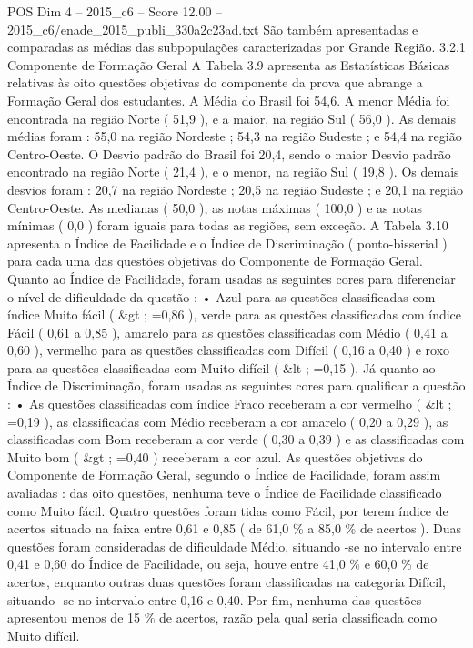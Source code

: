\begin{textsample}{POS Dim 4 – 2015\_c6 – Score 12.00 – 2015\_c6/enade\_2015\_publi\_330a2c23ad.txt}
São também apresentadas e comparadas as médias das subpopulações caracterizadas por Grande Região. 3.2.1 Componente de Formação Geral A Tabela 3.9 apresenta as Estatísticas Básicas relativas às oito questões objetivas do componente da prova que abrange a Formação Geral dos estudantes.
A Média do Brasil foi 54,6.
A menor Média foi encontrada na região Norte ( 51,9 ), e a maior, na região Sul ( 56,0 ).
As demais médias foram : 55,0 na região Nordeste ; 54,3 na região Sudeste ; e 54,4 na região Centro-Oeste.
O Desvio padrão do Brasil foi 20,4, sendo o maior Desvio padrão encontrado na região Norte ( 21,4 ), e o menor, na região Sul ( 19,8 ).
Os demais desvios foram : 20,7 na região Nordeste ; 20,5 na região Sudeste ; e 20,1 na região Centro-Oeste.
As medianas ( 50,0 ), as notas máximas ( 100,0 ) e as notas mínimas ( 0,0 ) foram iguais para todas as regiões, sem exceção.
A Tabela 3.10 apresenta o Índice de Facilidade e o Índice de Discriminação ( ponto-bisserial ) para cada uma das questões objetivas do Componente de Formação Geral.
Quanto ao Índice de Facilidade, foram usadas as seguintes cores para diferenciar o nível de dificuldade da questão : • Azul para as questões classificadas com índice Muito fácil ( \&gt ; =0,86 ), verde para as questões classificadas com índice Fácil ( 0,61 a 0,85 ), amarelo para as questões classificadas com Médio ( 0,41 a 0,60 ), vermelho para as questões classificadas com Difícil ( 0,16 a 0,40 ) e roxo para as questões classificadas com Muito difícil ( \&lt ; =0,15 ).
Já quanto ao Índice de Discriminação, foram usadas as seguintes cores para qualificar a questão : • As questões classificadas com índice Fraco receberam a cor vermelho ( \&lt ; =0,19 ), as classificadas com Médio receberam a cor amarelo ( 0,20 a 0,29 ), as classificadas com Bom receberam a cor verde ( 0,30 a 0,39 ) e as classificadas com Muito bom ( \&gt ; =0,40 ) receberam a cor azul.
As questões objetivas do Componente de Formação Geral, segundo o Índice de Facilidade, foram assim avaliadas : das oito questões, nenhuma teve o Índice de Facilidade classificado como Muito fácil.
Quatro questões foram tidas como Fácil, por terem índice de acertos situado na faixa entre 0,61 e 0,85 ( de 61,0 \% a 85,0 \% de acertos ).
Duas questões foram consideradas de dificuldade Médio, situando -se no intervalo entre 0,41 e 0,60 do Índice de Facilidade, ou seja, houve entre 41,0 \% e 60,0 \% de acertos, enquanto outras duas questões foram classificadas na categoria Difícil, situando -se no intervalo entre 0,16 e 0,40.
Por fim, nenhuma das questões apresentou menos de 15 \% de acertos, razão pela qual seria classificada como Muito difícil.

\end{textsample}
